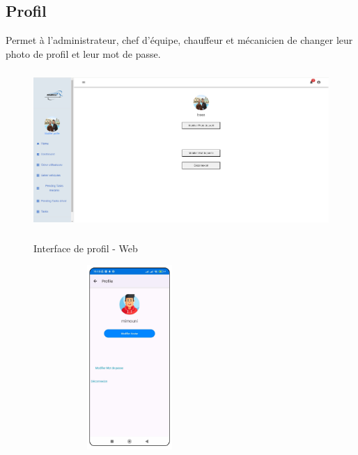 \vspace{1.2cm}

\subsection{ Profil}

Permet à l'administrateur, chef d'équipe, chauffeur et mécanicien de changer leur photo de profil et leur mot de passe.

\begin{figure}[h!]
  \centering
  \begin{minipage}[t]{0.60\textwidth}
    \centering
    \includegraphics[width=1\textwidth, height=6cm]{chap3.images/modifier profil (web).png}
    \caption{Interface de profil  - Web}
  \end{minipage}
  \hfill
  \begin{minipage}[t]{0.38\textwidth}
    \centering
    \includegraphics[width=0.65\textwidth, height=7cm]{chap3.images/modifier profil mobile.png}
    \caption{}
  \end{minipage}
\end{figure}






